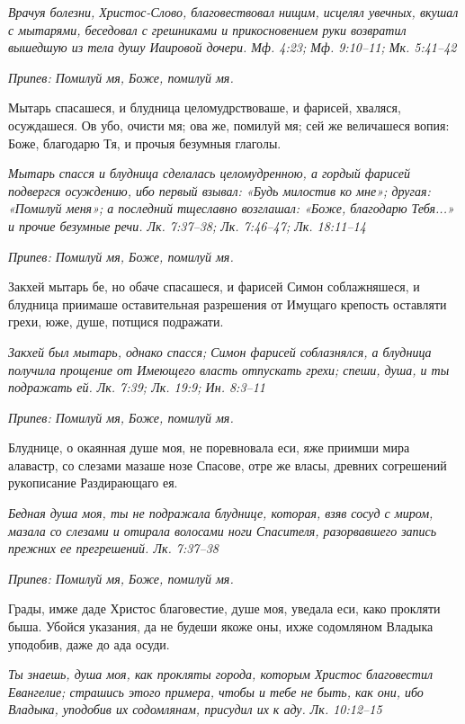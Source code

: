 \itshape Врачуя болезни, Христос-Слово, благовествовал нищим, исцелял увечных, вкушал с мытарями, беседовал с грешниками и прикосновением руки возвратил вышедшую из тела душу Иаировой дочери. Мф. 4:23; Мф. 9:10–11; Мк. 5:41–42\normalfont{}


\itshape Припев:\normalfont{} Помилуй мя, Боже, помилуй мя.


Мытарь спасашеся, и блудница целомудрствоваше, и фарисей, хваляся, осуждашеся. Ов убо, очисти мя; ова же, помилуй мя; сей же величашеся вопия: Боже, благодарю Тя, и прочыя безумныя глаголы.


\itshape Мытарь спасся и блудница сделалась целомудренною, а гордый фарисей подвергся осуждению, ибо первый взывал: «Будь милостив ко мне»; другая: «Помилуй меня»; а последний тщеславно возглашал: «Боже, благодарю Тебя...» и прочие безумные речи. Лк. 7:37–38; Лк. 7:46–47; Лк. 18:11–14\normalfont{}


\itshape Припев:\normalfont{} Помилуй мя, Боже, помилуй мя.


Закхей мытарь бе, но обаче спасашеся, и фарисей Симон соблажняшеся, и блудница приимаше оставительная разрешения от Имущаго крепость оставляти грехи, юже, душе, потщися подражати.


\itshape Закхей был мытарь, однако спасся; Симон фарисей соблазнялся, а блудница получила прощение от Имеющего власть отпускать грехи; спеши, душа, и ты подражать ей. Лк. 7:39; Лк. 19:9; Ин. 8:3–11\normalfont{}


\itshape Припев:\normalfont{} Помилуй мя, Боже, помилуй мя.


Блуднице, о окаянная душе моя, не поревновала еси, яже приимши мира алавастр, со слезами мазаше нозе Спасове, отре же власы, древних согрешений рукописание Раздирающаго ея.


\itshape Бедная душа моя, ты не подражала блуднице, которая, взяв сосуд с миром, мазала со слезами и отирала волосами ноги Спасителя, разорвавшего запись прежних ее прегрешений. Лк. 7:37–38\normalfont{}


\itshape Припев:\normalfont{} Помилуй мя, Боже, помилуй мя.


Грады, имже даде Христос благовестие, душе моя, уведала еси, како прокляти быша. Убойся указания, да не будеши якоже оны, ихже содомляном Владыка уподобив, даже до ада осуди.


\itshape Ты знаешь, душа моя, как прокляты города, которым Христос благовестил Евангелие; страшись этого примера, чтобы и тебе не быть, как они, ибо Владыка, уподобив их содомлянам, присудил их к аду. Лк. 10:12–15\normalfont{}


